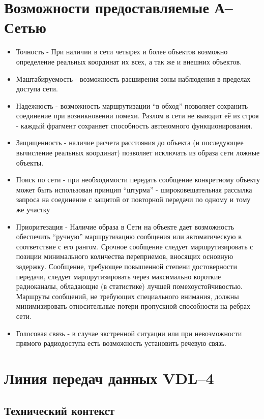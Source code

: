 \documentclass[a4paper,12pt]{report} %
\begin{document}
\section{Возможности предоставляемые А--Сетью}

\begin{itemize}
\item Точность - При наличии в сети четырех и более объектов возможно
  определение реальных координат их всех, а так же и внешних объектов. 
\item Маштабируемость - возможность расширения зоны наблюдения в пределах
  доступа сети.
\item Надежность - возможность маршрутизации ``в обход'' позволяет сохранить
  соединение при возникновении помехи. Разлом в сети не выводит её из строя -
  каждый фрагмент сохраняет способность автономного функционирования.
\item Защищенность - наличие расчета расстояния до объекта (и последующее
  вычисление реальных координат) позволяет исключать из образа сети ложные
  объекты.
\item Поиск по сети - при необходимости передать сообщение конкретному объекту
  может быть использован принцип ``штурма'' - широковещательная рассылка запроса
  на соединение с защитой от повторной передачи по одному и тому же участку
\item Приоритезация - Наличие образа в Сети на объекте дает возможность
  обеспечить ``ручную'' маршрутизацию сообщения или автоматическую в
  соответствие с его рангом. Срочное сообщение следует маршрутизировать с
  позиции минимального количества переприемов,  вносящих основную задержку.
  Сообщение, требующее повышенной степени достоверности передачи, следует
  маршрутизировать через максимально короткие радиоканалы, обладающие (в
  статистике) лучшей помехоустойчивостью. Маршруты сообщений, не требующих
  специального внимания, должны минимизировать относительные потери пропускной
  способности на ребрах сети. 
\item Голосовая связь - в случае экстренной ситуации или при невозможности
  прямого радиодоступа есть возможность установить речевую связь.
\end{itemize}
\newpage

\section{Линия передач данных VDL--4 \cite{vdl4desc}}

\subsection{Технический контекст}
\end{document}
